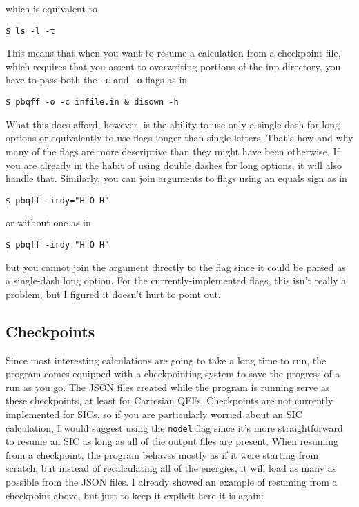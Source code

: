 \documentclass{article}
\begin{document}
\noindent
which is equivalent to 

\begin{verbatim}
$ ls -l -t
\end{verbatim}

This means that when you want to resume a calculation from a
checkpoint file, which requires that you assent to overwriting
portions of the inp directory, you have to pass both the \verb|-c| and
\verb|-o| flags as in

\begin{verbatim}
$ pbqff -o -c infile.in & disown -h
\end{verbatim}

What this does afford, however, is the ability to use only a single
dash for long options or equivalently to use flags longer than single
letters. That's how and why many of the flags are more descriptive
than they might have been otherwise. If you are already in the habit
of using double dashes for long options, it will also handle
that. Similarly, you can join arguments to flags using an equals sign
as in

\begin{verbatim}
$ pbqff -irdy="H O H"
\end{verbatim}

\noindent
or without one as in

\begin{verbatim}
$ pbqff -irdy "H O H"
\end{verbatim}

\noindent
but you cannot join the argument directly to the flag since it could
be parsed as a single-dash long option. For the currently-implemented
flags, this isn't really a problem, but I figured it doesn't hurt to
point out.

\subsection{Checkpoints}

Since most interesting calculations are going to take a long time to
run, the program comes equipped with a checkpointing system to save
the progress of a run as you go. The JSON files created while the
program is running serve as these checkpoints, at least for Cartesian
QFFs. Checkpoints are not currently implemented for SICs, so if you
are particularly worried about an SIC calculation, I would suggest
using the \verb|nodel| flag since it's more straightforward to resume
an SIC as long as all of the output files are present. When resuming
from a checkpoint, the program behaves mostly as if it were starting
from scratch, but instead of recalculating all of the energies, it
will load as many as possible from the JSON files. I already showed an
example of resuming from a checkpoint above, but just to keep it
explicit here it is again:
\end{document}

